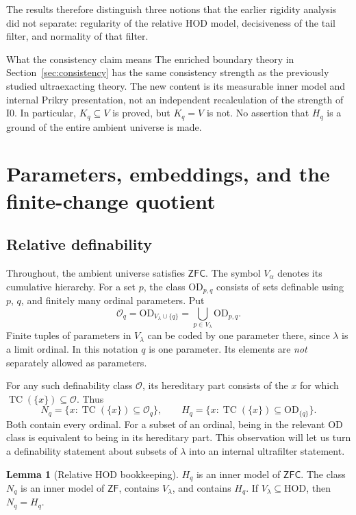 \documentclass[11pt,letterpaper]{article}
\theoremstyle{definition}
\newtheorem{lemma}[definition]{Lemma}
\numberwithin{equation}{section}
\newcommand{\ZFC}{\mathsf{ZFC}}
\newcommand{\ZF}{\mathsf{ZF}}
\newcommand{\HOD}{\mathrm{HOD}}
\newcommand{\OD}{\mathrm{OD}}
\newcommand{\Izero}{\mathrm{I0}}
\newcommand{\TC}{\operatorname{TC}}
\begin{document}
The results therefore distinguish three notions that the earlier rigidity analysis did not separate: regularity of the relative HOD model, decisiveness of the tail filter, and normality of that filter.

\begin{assessment}{What the consistency claim means}
The enriched boundary theory in Section~\ref{sec:consistency} has the same consistency strength as the previously studied ultraexacting theory. The new content is its measurable inner model and internal Prikry presentation, not an independent recalculation of the strength of $\Izero$. In particular, $K_q\subseteq V$ is proved, but $K_q=V$ is not. No assertion that $H_q$ is a ground of the entire ambient universe is made.
\end{assessment}

\section{Parameters, embeddings, and the finite-change quotient}\label{sec:setup}

\subsection{Relative definability}

Throughout, the ambient universe satisfies $\ZFC$. The symbol $V_\alpha$ denotes its cumulative hierarchy. For a set $p$, the class $\OD_{p,q}$ consists of sets definable using $p$, $q$, and finitely many ordinal parameters. Put
\[
 \mathcal O_q=\OD_{V_\lambda\cup\{q\}}
     =\bigcup_{p\in V_\lambda}\OD_{p,q}.
\]
Finite tuples of parameters in $V_\lambda$ can be coded by one parameter there, since $\lambda$ is a limit ordinal. In this notation $q$ is one parameter. Its elements are \emph{not} separately allowed as parameters.

For any such definability class $\mathcal O$, its hereditary part consists of the $x$ for which $\TC(\{x\})\subseteq\mathcal O$. Thus
\[
 N_q=\{x:\TC(\{x\})\subseteq\mathcal O_q\},\qquad
 H_q=\{x:\TC(\{x\})\subseteq\OD_{\{q\}}\}.
\]
Both contain every ordinal. For a subset of an ordinal, being in the relevant OD class is equivalent to being in its hereditary part. This observation will let us turn a definability statement about subsets of $\lambda$ into an internal ultrafilter statement.

\begin{lemma}[Relative HOD bookkeeping]\label{lem:hod}
$H_q$ is an inner model of $\ZFC$. The class $N_q$ is an inner model of $\ZF$, contains $V_\lambda$, and contains $H_q$. If $V_\lambda\subseteq\HOD$, then $N_q=H_q$.
\end{lemma}
\end{document}
